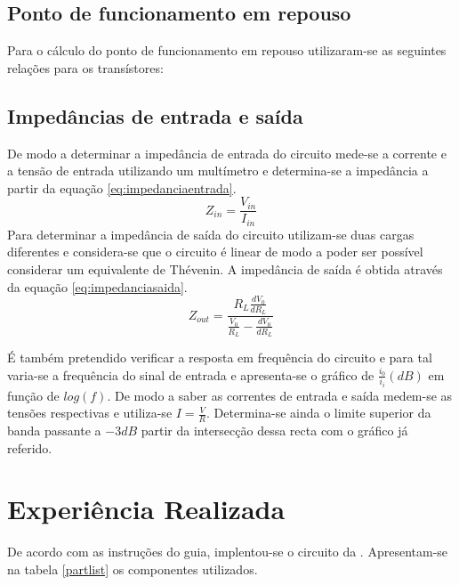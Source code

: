 \documentclass[%
  reprint,
  nofootinbib,
  amsmath,amssymb,
  aps,
  10pt,
  a4paper
]{revtex4-1}
\begin{document}
\subsection{Ponto de funcionamento em repouso}
Para o cálculo do ponto de funcionamento em repouso utilizaram-se as seguintes relações para os transístores:


\subsection{Impedâncias de entrada e saída}

De modo a determinar a impedância de entrada do circuito mede-se a corrente e a tensão de entrada utilizando um multímetro e determina-se a impedância a partir da equação \ref{eq:impedanciaentrada}.
\begin{equation}
Z_{in}=\frac{V_{in}}{I_{in}}
\label{eq:impedanciaentrada}
\end{equation}
Para determinar a impedância de saída do circuito utilizam-se duas cargas diferentes e considera-se que o circuito é linear de modo a poder ser possível considerar um equivalente de Thévenin. A impedância de saída é obtida através da equação \ref{eq:impedanciasaida}.
\begin{equation}
Z_{out}=\frac{R_L \frac{dV_0}{dR_L}}{\frac{V_0}{R_L}-\frac{dV_0}{dR_L}}
\label{eq:impedanciasaida}
\end{equation}

É também pretendido verificar a resposta em frequência do circuito e para tal varia-se a frequência do sinal de entrada e apresenta-se o gráfico de $\frac{i_0}{i_i} (dB)$ em função de $log(f)$. De modo a saber as correntes de entrada e saída medem-se as tensões respectivas e utiliza-se $I=\frac{V}{R}$. Determina-se ainda o limite superior da banda passante a $-3dB$ partir da intersecção dessa recta com o gráfico já referido. 

\section{Experiência Realizada}
\label{s:expreal}
De acordo com as instruções do guia, implentou-se o circuito da . Apresentam-se na tabela \ref{partlist} os componentes utilizados.
\end{document}
